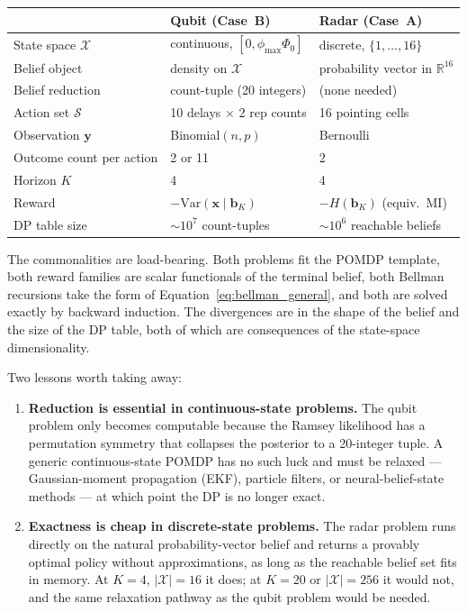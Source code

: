 \documentclass[11pt]{article}
\newcommand{\bx}{\bm{x}}
\newcommand{\by}{\bm{y}}
\newcommand{\bb}{\bm{b}}
\newcommand{\R}{\mathbb{R}}
\begin{document}
\begin{center}
\begin{tabular}{@{}lll@{}}
\toprule
 & \textbf{Qubit (Case~B)} & \textbf{Radar (Case~A)} \\
\midrule
State space $\mathcal{X}$           & continuous, $[0, \phi_{\max}\Phi_0]$  & discrete, $\{1, \ldots, 16\}$ \\
Belief object                       & density on $\mathcal{X}$              & probability vector in $\R^{16}$ \\
Belief reduction                    & count-tuple (20 integers)             & (none needed) \\
Action set $\mathcal{S}$            & 10 delays $\times$ 2 rep counts       & 16 pointing cells \\
Observation $\by$                   & Binomial$(n, p)$                       & Bernoulli \\
Outcome count per action            & 2 or 11                                & 2 \\
Horizon $K$                         & 4                                      & 4 \\
Reward                              & $-\mathrm{Var}(\bx \mid \bb_K)$       & $-H(\bb_K)$ (equiv.\ MI) \\
DP table size                       & $\sim 10^7$ count-tuples              & $\sim 10^6$ reachable beliefs \\
\bottomrule
\end{tabular}
\end{center}

The commonalities are load-bearing.  Both problems fit the POMDP template, both reward families are scalar functionals of the terminal belief, both Bellman recursions take the form of Equation~\eqref{eq:bellman_general}, and both are solved exactly by backward induction.  The divergences are in the shape of the belief and the size of the DP table, both of which are consequences of the state-space dimensionality.

Two lessons worth taking away:

\begin{enumerate}[nosep, leftmargin=*]
\item \textbf{Reduction is essential in continuous-state problems.}  The qubit problem only becomes computable because the Ramsey likelihood has a permutation symmetry that collapses the posterior to a 20-integer tuple.  A generic continuous-state POMDP has no such luck and must be relaxed --- Gaussian-moment propagation (EKF), particle filters, or neural-belief-state methods --- at which point the DP is no longer exact.
\item \textbf{Exactness is cheap in discrete-state problems.}  The radar problem runs directly on the natural probability-vector belief and returns a provably optimal policy without approximations, as long as the reachable belief set fits in memory.  At $K = 4$, $|\mathcal{X}| = 16$ it does; at $K = 20$ or $|\mathcal{X}| = 256$ it would not, and the same relaxation pathway as the qubit problem would be needed.
\end{enumerate}
\end{document}
